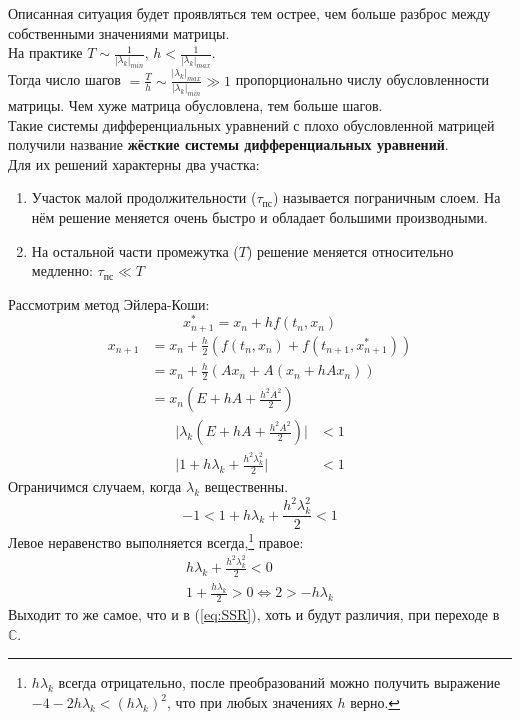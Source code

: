 \documentclass[a4paper,11pt]{article}
\begin{document}
Описанная ситуация будет проявляться тем острее, чем больше разброс между собственными значениями матрицы. \\
На практике $T \sim \frac{1}{|\lambda_k|_{min}},\, h < \frac{1}{|\lambda_k|_{max}}$. \\
Тогда число шагов $= \frac{T}{h} \sim \frac{|\lambda_k|_{max}}{|\lambda_k|_{min}} \gg 1$ пропорционально числу обусловленности матрицы. Чем хуже матрица
  обусловлена, тем больше шагов. \\
Такие системы дифференциальных уравнений с плохо обусловленной матрицей получили название \textbf{жёсткие системы дифференциальных уравнений}. \\
Для их решений характерны два участка:
\begin{enumerate}
  \item Участок малой продолжительности ($\tau_{\text{пс}}$) называется пограничным слоем. На нём решение меняется очень быстро и обладает большими производными.
  \item На остальной части промежутка ($T$) решение меняется относительно медленно: $\tau_{\text{пс}} \ll T$
\end{enumerate}
Рассмотрим метод Эйлера-Коши:
\[x_{n+1}^* = x_n + hf(t_n, x_n)\]
\begin{align*}
  x_{n+1} &= x_n + \frac{h}{2}(f(t_n, x_n) + f(t_{n+1}, x_{n+1}^*)) \\
          &= x_n + \frac{h}{2}(Ax_n + A(x_n + hAx_n)) \\
          &= x_n(E + hA + \frac{h^2A^2}{2})
\end{align*}
\begin{align*}
  \Big|\lambda_k(E + hA + \frac{h^2A^2}{2})\Big| &< 1 \\
  \Big|1 + h\lambda_k + \frac{h^2\lambda_k^2}{2}\Big| &< 1
\end{align*}
Ограничимся случаем, когда $\lambda_k$ вещественны.
\[-1 < 1 + h\lambda_k + \frac{h^2\lambda_k^2}{2} < 1\]
Левое неравенство выполняется всегда,\footnote{$h\lambda_k$ всегда отрицательно, после преобразований можно получить выражение $-4-2h\lambda_k < (h\lambda_k)^2$, 
                                              что при любых значениях $h$ верно.} правое:
\begin{gather*}
  h\lambda_k + \frac{h^2\lambda_k^2}{2} < 0 \\
  1 + \frac{h\lambda_k}{2} > 0 \Leftrightarrow 2 > -h\lambda_k
\end{gather*}
Выходит то же самое, что и в (\ref{eq:SSR}), хоть и будут различия, при переходе в $\mathbb{C}$. \\
\end{document}
